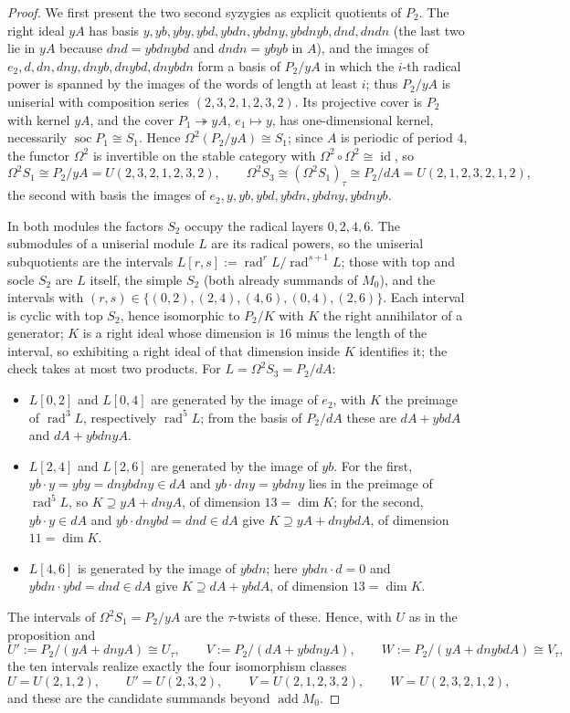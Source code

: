 \documentclass[11pt]{amsart}
\theoremstyle{plain}
\theoremstyle{definition}
\DeclareMathOperator{\rad}{rad}
\DeclareMathOperator{\add}{add}
\DeclareMathOperator{\soc}{soc}
\begin{document}
\begin{proof}
We first present the two second syzygies as explicit quotients of $P_2$. The right ideal $yA$ has basis
$y,yb,yby,ybd,ybdn,ybdny,ybdnyb,dnd,dndn$ (the last two lie in $yA$ because $dnd=ybdnybd$ and $dndn=ybyb$ in
$A$), and the images of $e_2,d,dn,dny,dnyb,dnybd,dnybdn$ form a basis of $P_2/yA$ in which the $i$-th radical
power is spanned by the images of the words of length at least $i$; thus $P_2/yA$ is uniserial with
composition series $(2,3,2,1,2,3,2)$. Its projective cover is $P_2$ with kernel $yA$, and the cover
$P_1\twoheadrightarrow yA$, $e_1\mapsto y$, has one-dimensional kernel, necessarily $\soc P_1\cong S_1$. Hence
$\Omega^2(P_2/yA)\cong S_1$; since $A$ is periodic of period $4$, the functor $\Omega^2$ is invertible on the
stable category with $\Omega^2\circ\Omega^2\cong\operatorname{id}$, so
\[
 \Omega^2S_1\cong P_2/yA=U(2,3,2,1,2,3,2),\qquad
 \Omega^2S_3\cong(\Omega^2S_1)_\tau\cong P_2/dA=U(2,1,2,3,2,1,2),
\]
the second with basis the images of $e_2,y,yb,ybd,ybdn,ybdny,ybdnyb$.

In both modules the factors $S_2$ occupy the radical layers $0,2,4,6$. The submodules of a uniserial module
$L$ are its radical powers, so the uniserial subquotients are the intervals $L[r,s]:=\rad^rL/\rad^{s+1}L$;
those with top and socle $S_2$ are $L$ itself, the simple $S_2$ (both already summands of $M_0$), and the
intervals with $(r,s)\in\{(0,2),(2,4),(4,6),(0,4),(2,6)\}$. Each interval is cyclic with top $S_2$, hence
isomorphic to $P_2/K$ with $K$ the right annihilator of a generator; $K$ is a right ideal whose dimension is
$16$ minus the length of the interval, so exhibiting a right ideal of that dimension inside $K$ identifies it;
the check takes at most two products. For $L=\Omega^2S_3=P_2/dA$:
\begin{itemize}
 \item $L[0,2]$ and $L[0,4]$ are generated by the image of $e_2$, with $K$ the preimage of $\rad^3L$,
respectively $\rad^5L$; from the basis of $P_2/dA$ these are $dA+ybdA$ and $dA+ybdnyA$.
 \item $L[2,4]$ and $L[2,6]$ are generated by the image of $yb$. For the first,
$yb\cdot y=yby=dnybdny\in dA$ and $yb\cdot dny=ybdny$ lies in the preimage of $\rad^5L$, so $K\supseteq
yA+dnyA$, of dimension $13=\dim K$; for the second, $yb\cdot y\in dA$ and $yb\cdot dnybd=dnd\in dA$ give
$K\supseteq yA+dnybdA$, of dimension $11=\dim K$.
 \item $L[4,6]$ is generated by the image of $ybdn$; here $ybdn\cdot d=0$ and $ybdn\cdot ybd=dnd\in dA$
give $K\supseteq dA+ybdA$, of dimension $13=\dim K$.
\end{itemize}
The intervals of $\Omega^2S_1=P_2/yA$ are the $\tau$-twists of these. Hence, with $U$ as in the proposition
and
\[
 U':=P_2/(yA+dnyA)\cong U_\tau,\qquad V:=P_2/(dA+ybdnyA),\qquad W:=P_2/(yA+dnybdA)\cong V_\tau,
\]
the ten intervals realize exactly the four isomorphism classes
\[
 U=U(2,1,2),\qquad U'=U(2,3,2),\qquad V=U(2,1,2,3,2),\qquad W=U(2,3,2,1,2),
\]
and these are the candidate summands beyond $\add M_0$.


\end{proof}
\end{document}
